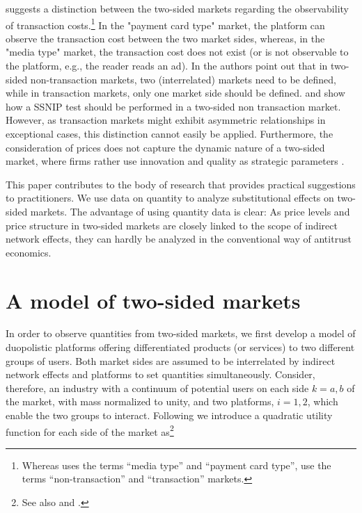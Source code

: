 \documentclass[12pt,a4paper,notitlepage]{article}
\begin{document}
\citet{filistrucchi_ssnip_2008} suggests a distinction between the two-sided markets regarding the observability of transaction costs.\footnote{Whereas \citet{filistrucchi_ssnip_2008} uses the terms “media type” and “payment card type”, \citet{filistrucchi_market_2013} use the terms “non-transaction” and “transaction” markets.} In the "payment card type" market, the platform can observe the transaction cost between the two market sides, whereas, in the "media type" market, the transaction cost does not exist (or is not observable to the platform, e.g., the reader reads an ad). In \citet{filistrucchi_market_2013} the authors point out that in two-sided non-transaction markets, two (interrelated) markets need to be defined, while in transaction markets, only one market side should be defined. \citet{emch_market_2006} and \citet{alexandrov_antitrust_2011} show how a SSNIP test should be performed in a two-sided non transaction market. However, as transaction markets might exhibit asymmetric relationships in exceptional cases, this distinction cannot easily be applied. Furthermore, the consideration of prices does not capture the dynamic nature of a two-sided market, where firms rather use innovation and quality as strategic parameters \citep{gual_market_2003}.

This paper contributes to the body of research that provides practical suggestions to practitioners. We use data on quantity to analyze substitutional effects on two-sided markets. The advantage of using quantity data is clear: As price levels and price structure in two-sided markets are closely linked to the scope of indirect network effects, they can hardly be analyzed in the conventional way of antitrust economics. 




\section{A model of two-sided markets}\label{model}
In order to observe quantities from two-sided markets, we first develop a model of duopolistic platforms offering differentiated products (or services) to two different groups of users. Both market sides are assumed to be interrelated by indirect network effects and platforms to set quantities simultaneously. Consider, therefore, an industry with a continuum of potential users on each side $k = a,b$ of the market, with mass normalized to unity, and two platforms, $i = 1,2$, which enable the two groups to interact. Following \cite{shubik_market_1980} we introduce a quadratic utility function for each side of the market as\footnote{See also \cite{dixit_model_1979} and \cite{kind_competition_2006}.}
\end{document}
